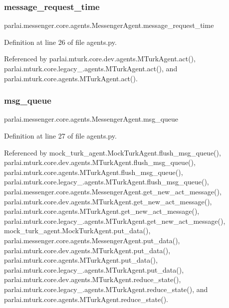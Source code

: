 \subsubsection{\texorpdfstring{message\+\_\+request\+\_\+time}{message\_request\_time}}
{\footnotesize\ttfamily parlai.\+messenger.\+core.\+agents.\+Messenger\+Agent.\+message\+\_\+request\+\_\+time}



Definition at line 26 of file agents.\+py.



Referenced by parlai.\+mturk.\+core.\+dev.\+agents.\+M\+Turk\+Agent.\+act(), parlai.\+mturk.\+core.\+legacy\+\_.\+agents.\+M\+Turk\+Agent.\+act(), and parlai.\+mturk.\+core.\+agents.\+M\+Turk\+Agent.\+act().

\mbox{\label{classparlai_1_1messenger_1_1core_1_1agents_1_1MessengerAgent_a3b73f02aa706918d26fd5cf42a441753}} 
\subsubsection{\texorpdfstring{msg\+\_\+queue}{msg\_queue}}
{\footnotesize\ttfamily parlai.\+messenger.\+core.\+agents.\+Messenger\+Agent.\+msg\+\_\+queue}



Definition at line 27 of file agents.\+py.



Referenced by mock\+\_\+turk\+\_\+agent.\+Mock\+Turk\+Agent.\+flush\+\_\+msg\+\_\+queue(), parlai.\+mturk.\+core.\+dev.\+agents.\+M\+Turk\+Agent.\+flush\+\_\+msg\+\_\+queue(), parlai.\+mturk.\+core.\+agents.\+M\+Turk\+Agent.\+flush\+\_\+msg\+\_\+queue(), parlai.\+mturk.\+core.\+legacy\+\_.\+agents.\+M\+Turk\+Agent.\+flush\+\_\+msg\+\_\+queue(), parlai.\+messenger.\+core.\+agents.\+Messenger\+Agent.\+get\+\_\+new\+\_\+act\+\_\+message(), parlai.\+mturk.\+core.\+dev.\+agents.\+M\+Turk\+Agent.\+get\+\_\+new\+\_\+act\+\_\+message(), parlai.\+mturk.\+core.\+agents.\+M\+Turk\+Agent.\+get\+\_\+new\+\_\+act\+\_\+message(), parlai.\+mturk.\+core.\+legacy\+\_.\+agents.\+M\+Turk\+Agent.\+get\+\_\+new\+\_\+act\+\_\+message(), mock\+\_\+turk\+\_\+agent.\+Mock\+Turk\+Agent.\+put\+\_\+data(), parlai.\+messenger.\+core.\+agents.\+Messenger\+Agent.\+put\+\_\+data(), parlai.\+mturk.\+core.\+dev.\+agents.\+M\+Turk\+Agent.\+put\+\_\+data(), parlai.\+mturk.\+core.\+agents.\+M\+Turk\+Agent.\+put\+\_\+data(), parlai.\+mturk.\+core.\+legacy\+\_.\+agents.\+M\+Turk\+Agent.\+put\+\_\+data(), parlai.\+mturk.\+core.\+dev.\+agents.\+M\+Turk\+Agent.\+reduce\+\_\+state(), parlai.\+mturk.\+core.\+legacy\+\_.\+agents.\+M\+Turk\+Agent.\+reduce\+\_\+state(), and parlai.\+mturk.\+core.\+agents.\+M\+Turk\+Agent.\+reduce\+\_\+state().

